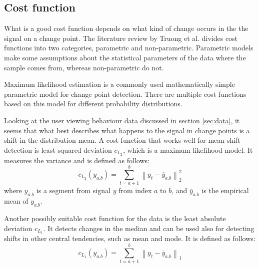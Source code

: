 \subsection{Cost function} \label{subsec:costfunction}


What is a good cost function depends on what kind of change occurs in the the signal on a change point. The literature review by Truong et al. \cite{truongSelectiveReviewOffline2020} divides cost functions into two categories, parametric and non-parametric. Parametric models make some assumptions about the statistical parameters of the data where the sample comes from, whereas non-parametric do not.

Maximum likelihood estimation is a commonly used mathematically simple parametric model for change point detection. %
There are multiple cost functions based on this model for different probability distributions.

Looking at the user viewing behaviour data discussed in section \ref{sec:data}, it seems that what best describes what happens to the signal in change points is a shift in the distribution mean. A cost function that works well for mean shift detection is least squared deviation $c_{L_2}$, which is a maximum likelihood model. It measures the variance and is defined as follows:
\begin{equation} %
    c_{L_2}(y_{a.b}) = \sum^b_{t=a+1} \left\lVert y_t-\overline{y}_{a.b} \right\rVert ^2_2
    \label{eq:l2}
\end{equation}
where $y_{a.b}$ is a segment from signal $y$ from index $a$ to $b$, and  $\overline{y}_{a.b}$ is the empirical mean of $y_{a.b}$.

Another possibly suitable cost function for the data is the least absolute deviation $c_{L_1}$. It detects changes in the median and can be used also for detecting shifts in other central tendencies, such as mean and mode. It is defined as follows:
\begin{equation} %
  c_{L_1}(y_{a.b}) = \sum^b_{t=a+1} \left\lVert y_t-\overline{y}_{a.b} \right\rVert_1
  \label{eq:l1}
\end{equation}

